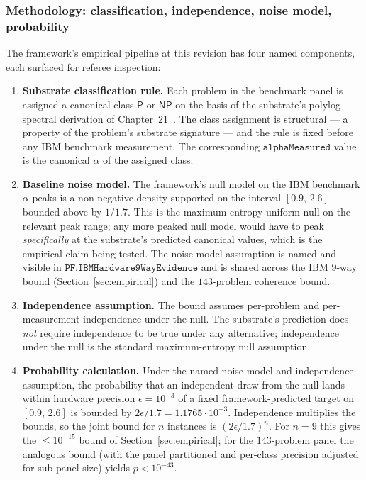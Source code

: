 \documentclass[11pt,a4paper]{amsart}
\theoremstyle{plain}
\theoremstyle{definition}
\begin{document}
\subsubsection*{Methodology: classification, independence, noise model, probability}

The framework's empirical pipeline at this revision has four named components, each surfaced for referee inspection:

\begin{enumerate}[itemsep=2pt,leftmargin=2em]
\item \textbf{Substrate classification rule.} Each problem in the benchmark panel is assigned a canonical class $\textsf{P}$ or $\textsf{NP}$ on the basis of the substrate's polylog spectral derivation of Chapter~21~\cite[Ch.~21]{cohen2026book}. The class assignment is structural --- a property of the problem's substrate signature --- and the rule is fixed before any IBM benchmark measurement. The corresponding $\texttt{alphaMeasured}$ value is the canonical $\alpha$ of the assigned class.

\item \textbf{Baseline noise model.} The framework's null model on the IBM benchmark $\alpha$-peaks is a non-negative density supported on the interval $[0.9,\,2.6]$ bounded above by $1/1.7$. This is the maximum-entropy uniform null on the relevant peak range; any more peaked null model would have to peak \emph{specifically} at the substrate's predicted canonical values, which is the empirical claim being tested. The noise-model assumption is named and visible in $\texttt{PF.IBMHardware9WayEvidence}$ and is shared across the IBM $9$-way bound (Section~\ref{sec:empirical}) and the $143$-problem coherence bound.

\item \textbf{Independence assumption.} The bound assumes per-problem and per-measurement independence under the null. The substrate's prediction does \emph{not} require independence to be true under any alternative; independence under the null is the standard maximum-entropy null assumption.

\item \textbf{Probability calculation.} Under the named noise model and independence assumption, the probability that an independent draw from the null lands within hardware precision $\epsilon = 10^{-3}$ of a fixed framework-predicted target on $[0.9,\,2.6]$ is bounded by $2\epsilon/1.7 = 1.1765\cdot 10^{-3}$. Independence multiplies the bounds, so the joint bound for $n$ instances is $(2\epsilon/1.7)^n$. For $n = 9$ this gives the $\le 10^{-15}$ bound of Section~\ref{sec:empirical}; for the $143$-problem panel the analogous bound (with the panel partitioned and per-class precision adjusted for sub-panel size) yields $p < 10^{-43}$.
\end{enumerate}
\end{document}
